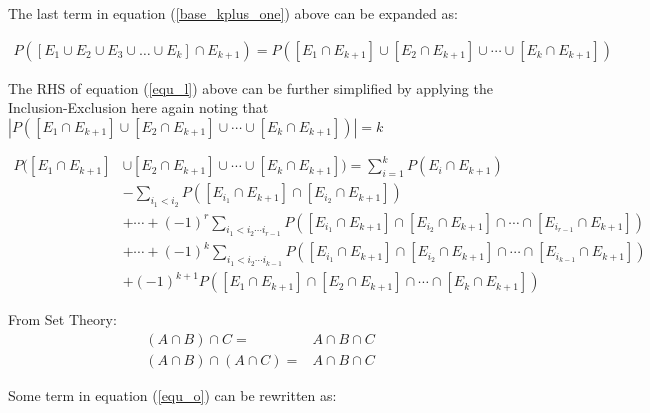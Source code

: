 \documentclass[a4paper]{article}
\begin{document}
    The last term in equation (\ref{base_kplus_one}) above can be expanded  as:

    \begin{equation} \label{equ_l}
        \begin{split}
            P([E_1 \cup E_2 \cup E_3 \cup \dots \cup E_k] \cap E_{k + 1}) = P([E_1 \cap E_{k + 1}] \cup [E_2 \cap E_{k + 1}] \cup \cdots \cup [E_k \cap E_{k + 1}])
        \end{split}
    \end{equation}

    The RHS of equation (\ref{equ_l}) above can be further simplified by applying the Inclusion-Exclusion here again
    noting that $|P([E_1 \cap E_{k + 1}] \cup [E_2 \cap E_{k + 1}] \cup \cdots \cup [E_k \cap E_{k + 1}])| = k$

    \begin{equation} \label{equ_o}
        \begin{split}
            P([E_1 \cap E_{k + 1}] &\cup [E_2 \cap E_{k + 1}] \cup \cdots \cup [E_k \cap E_{k + 1}]) = \sum_{i = 1}^{k} P(E_i \cap E_{k + 1}) \\
            & - \sum_{i_1 < i_2} P([E_{i_1} \cap E_{k + 1}] \cap [E_{i_2} \cap E_{k + 1}]) \\
            & + \cdots + {(-1)}^{r} \sum_{i_1 < i_2 \cdots i_{r - 1}} P([E_{i_1} \cap E_{k + 1}] \cap [E_{i_2} \cap E_{k + 1}] \cap \cdots \cap [E_{i_{r - 1}} \cap E_{k + 1}]) \\
            & + \cdots + {(-1)}^{k} \sum_{i_1 < i_2 \cdots i_{k - 1}} P([E_{i_1} \cap E_{k + 1}] \cap [E_{i_2} \cap E_{k + 1}] \cap \cdots \cap [E_{i_{k - 1}} \cap E_{k + 1}]) \\
            & + {(-1)}^{k + 1} P([E_1 \cap E_{k + 1}] \cap [E_2 \cap E_{k + 1}] \cap \cdots \cap [E_k \cap E_{k + 1}])
        \end{split}
    \end{equation}

    From Set Theory:
    \begin{equation*}
        \begin{split}
            (A \cap B) \cap C = & A \cap B \cap C \\
            (A \cap B) \cap (A \cap C) = & A \cap B \cap C
        \end{split}
    \end{equation*}

    Some term in equation (\ref{equ_o}) can be rewritten as:
\end{document}
